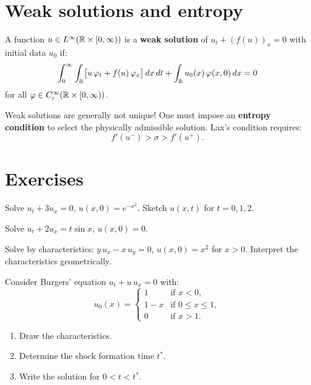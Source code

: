 \section{Weak solutions and entropy}

\begin{definition}
A function $u \in L^\infty(\mathbb{R} \times [0,\infty))$ is a \textbf{weak
solution} of $u_t + (f(u))_x = 0$ with initial data $u_0$ if:
\[
    \int_0^\infty \int_{\mathbb{R}} \bigl[u\, \varphi_t + f(u)\, \varphi_x\bigr]\, dx\, dt
    + \int_{\mathbb{R}} u_0(x)\, \varphi(x,0)\, dx = 0
\]
for all $\varphi \in C_c^\infty(\mathbb{R} \times [0,\infty))$.
\end{definition}

\begin{warning}[title=\textbf{Non-uniqueness of weak solutions}]
Weak solutions are generally not unique! One must impose an
\textbf{entropy condition} to select the physically admissible solution.
Lax's condition requires:
\[
    f'(u^-) > \sigma > f'(u^+).
\]
\end{warning}

\section{Exercises}

\begin{exercise}
Solve $u_t + 3u_x = 0$, $u(x,0) = e^{-x^2}$. Sketch $u(x,t)$ for
$t = 0, 1, 2$.
\end{exercise}

\begin{exercise}
Solve $u_t + 2u_x = t\sin x$, $u(x,0) = 0$.
\end{exercise}

\begin{exercise}
Solve by characteristics:
$y\, u_x - x\, u_y = 0$, $u(x,0) = x^2$ for $x > 0$.
Interpret the characteristics geometrically.
\end{exercise}

\begin{exercise}
Consider Burgers' equation $u_t + u\, u_x = 0$ with:
\[
    u_0(x) = \begin{cases}
        1 & \text{if } x < 0,\\
        1 - x & \text{if } 0 \leq x \leq 1,\\
        0 & \text{if } x > 1.
    \end{cases}
\]
\begin{enumerate}
    \item Draw the characteristics.
    \item Determine the shock formation time $t^*$.
    \item Write the solution for $0 < t < t^*$.
\end{enumerate}
\end{exercise}

